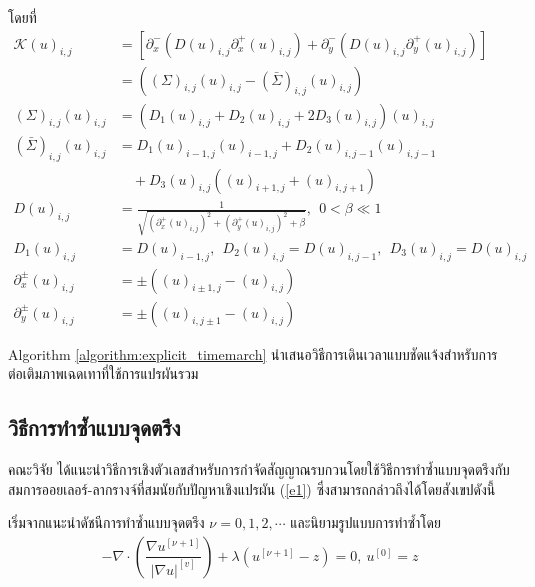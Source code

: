 โดยที่
\begin{align*}
	\mathcal{K}(u)_{i,j}&=\left[{\partial_x^-} \left( {D(u)_{i,j}\partial_x^+(u)_{i,j}}\right)+ 
		{\partial_y^-} \left( {D(u)_{i,j}\partial_y^+(u)_{i,j}}\right)\right]\\
	&=\left( (\Sigma)_{i,j}(u)_{i,j}-(\bar\Sigma)_{i,j}(u)_{i,j}\right)\\
	(\Sigma)_{i,j}(u)_{i,j}&= \left( D_1(u)_{i,j}+D_2(u)_{i,j}+2D_3(u)_{i,j}\right)(u)_{i,j}\\
	(\bar\Sigma)_{i,j}(u)_{i,j}&= D_1(u)_{i-1,j}(u)_{i-1,j}+D_2(u)_{i,j-1}(u)_{i,j-1}\\
	&\quad+D_3(u)_{i,j}\left((u)_{i+1,j}+(u)_{i,j+1}\right) \\
	D(u)_{i,j} &= \tfrac{1}{\sqrt{(\partial_{x}^{+}(u)_{i,j})^2+(\partial_{y}^{+}(u)_{i,j})^2+\beta}},\ \ 0<\beta \ll 1\\
	D_1(u)_{i,j}&=D(u)_{i-1,j}, \ \
	D_2(u)_{i,j}=D(u)_{i,j-1}, \ \
	D_3(u)_{i,j}=D(u)_{i,j} \\
	\partial_{x}^{\pm}(u)_{i,j}&=\pm\left( (u)_{i \pm 1,j}-(u)_{i,j}\right)\\
	\partial_{y}^{\pm}(u)_{i,j}&=\pm\left( (u)_{i,j\pm 1}-(u)_{i,j}\right)
\end{align*}
	
 \vspace{0.5cm} \hspace{1cm} Algorithm \ref{algorithm:explicit_timemarch} นำเสนอวิธีการเดินเวลาแบบชัดแจ้งสำหรับการต่อเติมภาพเฉดเทาที่ใช้การแปรผันรวม \\
 


\subsection{วิธีการทำซ้ำแบบจุดตรึง}

\hspace{1cm} คณะวิจัย \cite{ref:FixpointSolver} ได้แนะนำวิธีการเชิงตัวเลขสำหรับการกำจัดสัญญาณรบกวนโดยใช้วิธีการทำซ้ำแบบจุดตรึงกับสมการออยเลอร์-ลากรางจ์ที่สมนัยกับปัญหาเชิงแปรผัน (\ref{e1}) ซึ่งสามารถกล่าวถึงได้โดยสังเขปดังนี้
	
\hspace{1cm} เริ่มจากแนะนำดัชนีการทำซ้ำแบบจุดตรึง $\nu=0,1,2,\cdots$ และนิยามรูปแบบการทำซ้ำโดย
\begin{align}
	- \nabla\cdot\left(\dfrac{\nabla u^{[\nu+1]}}{{| \nabla u |}^{[v]} }\right) + \lambda(u^{[\nu+1]}-z)  = 0,\ u^{[0]}=z
	\label{e5}
\end{align}

